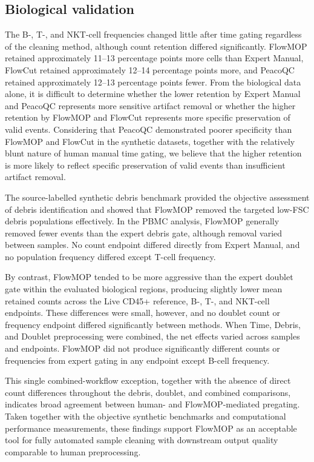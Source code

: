 \documentclass[ASNA]{latex/wiley/USG}
\begin{document}
\subsection{Biological validation}\label{biological-validation-1}

The B-, T-, and NKT-cell frequencies changed little after time gating
regardless of the cleaning method, although count retention differed
significantly. FlowMOP retained approximately 11--13 percentage points
more cells than Expert Manual, FlowCut retained approximately 12--14
percentage points more, and PeacoQC retained approximately 12--13
percentage points fewer. From the biological data alone, it is difficult
to determine whether the lower retention by Expert Manual and PeacoQC
represents more sensitive artifact removal or whether the higher
retention by FlowMOP and FlowCut represents more specific preservation
of valid events. Considering that PeacoQC demonstrated poorer
specificity than FlowMOP and FlowCut in the synthetic datasets, together
with the relatively blunt nature of human manual time gating, we believe
that the higher retention is more likely to reflect specific
preservation of valid events than insufficient artifact removal.

The source-labelled synthetic debris benchmark provided the objective
assessment of debris identification and showed that FlowMOP removed the
targeted low-FSC debris populations effectively. In the PBMC analysis,
FlowMOP generally removed fewer events than the expert debris gate,
although removal varied between samples. No count endpoint differed
directly from Expert Manual, and no population frequency differed except
T-cell frequency.

By contrast, FlowMOP tended to be more aggressive than the expert
doublet gate within the evaluated biological regions, producing slightly
lower mean retained counts across the Live CD45+ reference, B-, T-, and
NKT-cell endpoints. These differences were small, however, and no
doublet count or frequency endpoint differed significantly between
methods. When Time, Debris, and Doublet preprocessing were combined, the
net effects varied across samples and endpoints. FlowMOP did not produce
significantly different counts or frequencies from expert gating in any
endpoint except B-cell frequency.

This single combined-workflow exception, together with the absence of
direct count differences throughout the debris, doublet, and combined
comparisons, indicates broad agreement between human- and
FlowMOP-mediated pregating. Taken together with the objective synthetic
benchmarks and computational performance measurements, these findings
support FlowMOP as an acceptable tool for fully automated sample
cleaning with downstream output quality comparable to human
preprocessing.
\end{document}
